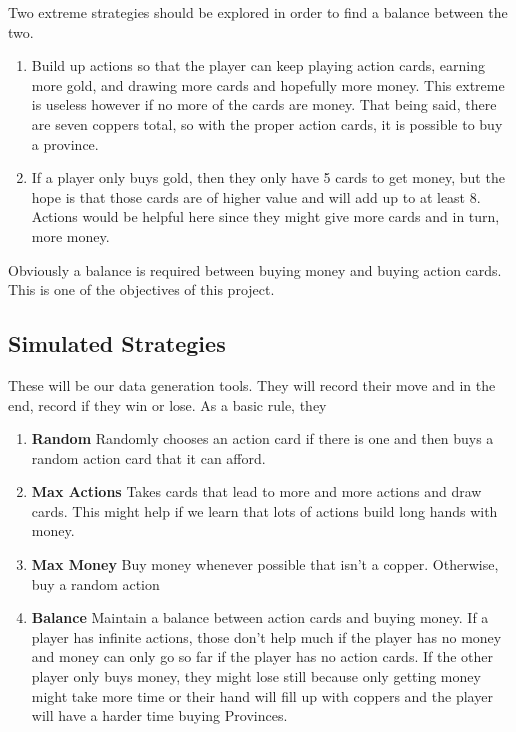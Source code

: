 \documentclass[11pt, oneside]{article}   	%
\begin{document}
Two extreme strategies should be explored in order to find a balance between the two.

	\begin{enumerate}
 		 \item Build up actions so that the player can keep playing action cards, earning more gold, and drawing more cards and hopefully more money. This extreme is useless however if no more of the cards are money. That being said, there are seven coppers total, so with the proper action cards, it is possible to buy a province. 
		 \item If a player only buys gold, then they only have 5 cards to get money, but the hope is that those cards are of higher value and will add up to at least 8. Actions would be helpful here since they might give more cards and in turn, more money. 
	\end{enumerate}
	
Obviously a balance is required between buying money and buying action cards. This is one of the objectives of this project. 


\subsection{Simulated Strategies}

These will be our data generation tools. They will record their move and in the end, record if they win or lose. As a basic rule, they 

	\begin{enumerate}
 		 \item \textbf{Random} Randomly chooses an action card if there is one and then buys a random action card that it can afford.
  		 \item \textbf{Max Actions} Takes cards that lead to more and more actions and draw cards. This might help if we learn that lots of actions build long hands with money. 
		 \item \textbf{Max Money} Buy money whenever possible that isn't a copper. Otherwise, buy a random action
		 \item \textbf{Balance} Maintain a balance between action cards and buying money. If a player has infinite actions, those don't help much if the player has no money and money can only go so far if the player has no action cards. If the other player only buys money, they might lose still because only getting money might take more time or their hand will fill up with coppers and the player will have a harder time buying Provinces. 
	\end{enumerate}
\end{document}
